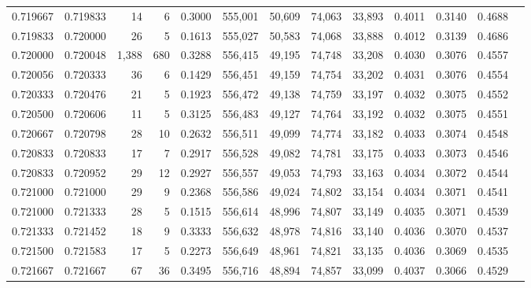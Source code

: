 \begin{tabular}{rrrrrrrrrrrrr}
0.719667 & 0.719833 &    14 &   6 &                                     0.3000 & 555,001 &  50,609 &  74,063 &  33,893 & 0.4011 & 0.3140 & 0.4688 \\
0.719833 & 0.720000 &    26 &   5 &                                     0.1613 & 555,027 &  50,583 &  74,068 &  33,888 & 0.4012 & 0.3139 & 0.4686 \\
0.720000 & 0.720048 & 1,388 & 680 &                                     0.3288 & 556,415 &  49,195 &  74,748 &  33,208 & 0.4030 & 0.3076 & 0.4557 \\
0.720056 & 0.720333 &    36 &   6 &                                     0.1429 & 556,451 &  49,159 &  74,754 &  33,202 & 0.4031 & 0.3076 & 0.4554 \\
0.720333 & 0.720476 &    21 &   5 &                                     0.1923 & 556,472 &  49,138 &  74,759 &  33,197 & 0.4032 & 0.3075 & 0.4552 \\
0.720500 & 0.720606 &    11 &   5 &                                     0.3125 & 556,483 &  49,127 &  74,764 &  33,192 & 0.4032 & 0.3075 & 0.4551 \\
0.720667 & 0.720798 &    28 &  10 &                                     0.2632 & 556,511 &  49,099 &  74,774 &  33,182 & 0.4033 & 0.3074 & 0.4548 \\
0.720833 & 0.720833 &    17 &   7 &                                     0.2917 & 556,528 &  49,082 &  74,781 &  33,175 & 0.4033 & 0.3073 & 0.4546 \\
0.720833 & 0.720952 &    29 &  12 &                                     0.2927 & 556,557 &  49,053 &  74,793 &  33,163 & 0.4034 & 0.3072 & 0.4544 \\
0.721000 & 0.721000 &    29 &   9 &                                     0.2368 & 556,586 &  49,024 &  74,802 &  33,154 & 0.4034 & 0.3071 & 0.4541 \\
0.721000 & 0.721333 &    28 &   5 &                                     0.1515 & 556,614 &  48,996 &  74,807 &  33,149 & 0.4035 & 0.3071 & 0.4539 \\
0.721333 & 0.721452 &    18 &   9 &                                     0.3333 & 556,632 &  48,978 &  74,816 &  33,140 & 0.4036 & 0.3070 & 0.4537 \\
0.721500 & 0.721583 &    17 &   5 &                                     0.2273 & 556,649 &  48,961 &  74,821 &  33,135 & 0.4036 & 0.3069 & 0.4535 \\
0.721667 & 0.721667 &    67 &  36 &                                     0.3495 & 556,716 &  48,894 &  74,857 &  33,099 & 0.4037 & 0.3066 & 0.4529 \\

\end{tabular}
